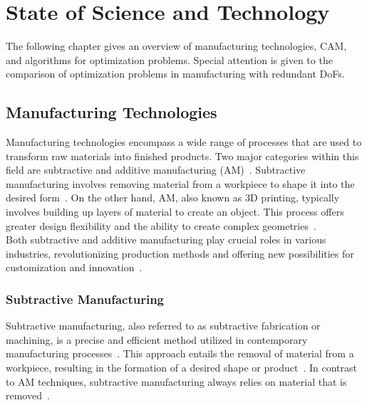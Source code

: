 \chapter{State of Science and Technology}\label{SST}
The following chapter gives an overview of manufacturing technologies, \acrshort{CAM}, and algorithms for optimization problems. Special attention is given to the comparison of optimization problems in manufacturing with redundant \acrshort{DoF}s. 







\section{Manufacturing Technologies}
Manufacturing technologies encompass a wide range of processes that are used to transform raw materials into finished products. Two major categories within this field are subtractive and additive manufacturing (\acrshort{AM})~\cite{Iqbal.2020}. Subtractive manufacturing involves removing material from a workpiece to shape it into the desired form~\cite{Watson.2015}. %
On the other hand, \acrshort{AM}, also known as 3D printing, typically involves building up layers of material to create an object. This process offers greater design flexibility and the ability to create complex geometries~\cite{Dilberoglu.2017}.\\ Both subtractive and additive manufacturing play crucial roles in various industries, revolutionizing production methods and offering new possibilities for customization and innovation~\cite{Bandyopadhyay.2020, vanLe.2017}.








\subsection{Subtractive Manufacturing}
Subtractive manufacturing, also referred to as subtractive fabrication or machining, is a precise and efficient method utilized in contemporary manufacturing processes~\cite{Wang.2023}. This approach entails the removal of material from a workpiece, resulting in the formation of a desired shape or product~\cite{Calleja.2018}. In contrast to \acrshort{AM} techniques, subtractive manufacturing always relies on material that is removed~\cite{Abdulhameed.2019}.

